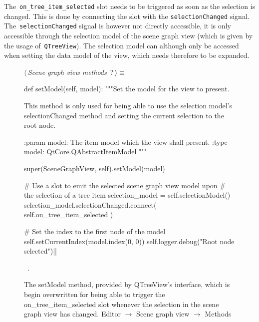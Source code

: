 \documentclass[%
    a4paper,    %
    justified,  %
    nobib,      %
    openany     %
]{tufte-book}
\makeatletter
\renewcommand{\label}[1]{\@tufte@label{##1}}%
\makeatother
\begin{document}
The~\verb=on_tree_item_selected= slot needs to be triggered as soon as the
selection is changed. This is done by connecting the slot with the
\verb=selectionChanged= signal. The~\verb=selectionChanged= signal is however
not directly accessible, it is only accessible through the selection model of
the scene graph view (which is given by the usage of~\verb=QTreeView=). The
selection model can although only be accessed when setting the data model of the
view, which needs therefore to be expanded.

\begin{figure}
\begin{flushleft} \small
\begin{minipage}{\linewidth}\label{scrap44}\raggedright\small
{} $\langle\,${\itshape Scene graph view methods}\nobreak\ {\footnotesize {?}}$\,\rangle\equiv$
\vspace{-1ex}
\begin{pythoncode}
def setModel(self, model):
    """Set the model for the view to present.

    This method is only used for being able to use the selection
    model's selectionChanged method and setting the current
    selection to the root node.

    :param model: The item model which the view shall present.
    :type  model: QtCore.QAbstractItemModel
    """

    super(SceneGraphView, self).setModel(model)

    # Use a slot to emit the selected scene graph view model upon
    # the selection of a tree item
    selection_model = self.selectionModel()
    selection_model.selectionChanged.connect(
        self.on_tree_item_selected
    )

    # Set the index to the first node of the model
    self.setCurrentIndex(model.index(0, 0))
    self.logger.debug("Root node selected")|\NWsep|
\end{pythoncode}
\vspace{1.5ex}
\footnotesize
\begin{list}{}{\setlength{\itemsep}{-\parsep}\setlength{\itemindent}{-\leftmargin}}
\item \NWtxtMacroRefIn\ .

\item{}
\end{list}
\end{minipage}\vspace{4ex}
\end{flushleft}
\caption{The setModel method, provided by QTreeView's interface, which is begin
  overwritten for being able to trigger the on\_tree\_item\_selected slot
  whenever the selection in the scene graph view has changed.
  \newline{}\newline{}Editor $\rightarrow$ Scene graph view
  $\rightarrow$ Methods}
\label{editor:lst:scene-graph-view:methods:set-model}
\end{figure}
\end{document}
